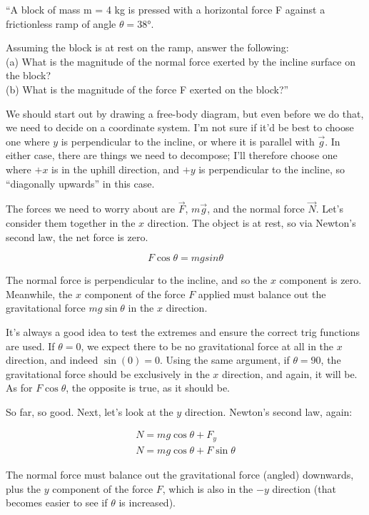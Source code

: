 \documentclass[12pt,a4paper]{report}
\begin{document}
``A block of mass m = 4 kg is pressed with a horizontal force F against a frictionless ramp of angle $\theta = \ang{38}$.

Assuming the block is at rest on the ramp, answer the following:\\
(a) What is the magnitude of the normal force exerted by the incline surface on the block?\\
(b) What is the magnitude of the force F exerted on the block?''

We should start out by drawing a free-body diagram, but even before we do that, we need to decide on a coordinate system. I'm not sure if it'd be best to choose one where $y$ is perpendicular to the incline, or where it is parallel with $\vec{g}$. In either case, there are things we need to decompose; I'll therefore choose one where $+x$ is in the uphill direction, and $+y$ is perpendicular to the incline, so ``diagonally upwards'' in this case.

The forces we need to worry about are $\vec{F}$, $m \vec{g}$, and the normal force $\vec{N}$. Let's consider them together in the $x$ direction. The object is at rest, so via Newton's second law, the net force is zero.

\begin{equation}
F \cos \theta = m g sin \theta
\end{equation}

The normal force is perpendicular to the incline, and so the $x$ component is zero. Meanwhile, the $x$ component of the force $F$ applied must balance out the gravitational force $m g \sin \theta$ in the $x$ direction.

It's always a good idea to test the extremes and ensure the correct trig functions are used. If $\theta = 0$, we expect there to be no gravitational force at all in the $x$ direction, and indeed $\sin(0) = 0$. Using the same argument, if $\theta = 90$, the gravitational force should be exclusively in the $x$ direction, and again, it will be. As for $F \cos \theta$, the opposite is true, as it should be.

So far, so good. Next, let's look at the $y$ direction. Newton's second law, again:

\begin{align}
N = m g \cos \theta + F_y\\
N = m g \cos \theta + F \sin \theta
\end{align}

The normal force must balance out the gravitational force (angled) downwards, plus the $y$ component of the force $F$, which is also in the $-y$ direction (that becomes easier to see if $\theta$ is increased).
\end{document}
